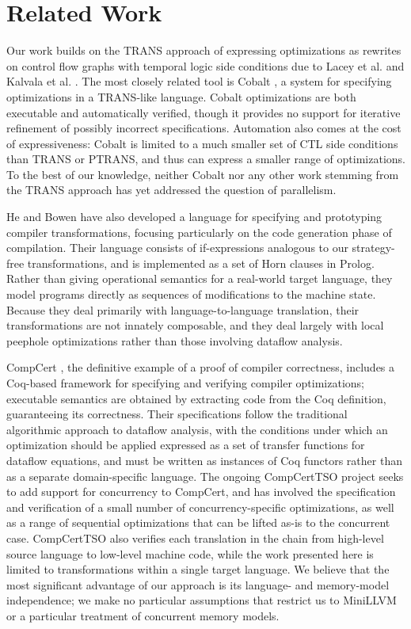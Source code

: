 \documentclass{eptcs}
\newcommand{\ptrans}[0]{PTRANS}
\begin{document}
\section{Related Work}
Our work builds on the TRANS approach of expressing optimizations as rewrites on control flow graphs with temporal logic side conditions due to Lacey et al. \cite{lacey} and Kalvala et al. \cite{kalvala}. The most closely related tool is Cobalt \cite{cobalt}, a system for specifying optimizations in a TRANS-like language. Cobalt optimizations are both executable and automatically verified, though it provides no support for iterative refinement of possibly incorrect specifications. Automation also comes at the cost of expressiveness: Cobalt is limited to a much smaller set of CTL side conditions than TRANS or {\ptrans}, and thus can express a smaller range of optimizations. To the best of our knowledge, neither Cobalt nor any other work stemming from the TRANS approach has yet addressed the question of parallelism.

He and Bowen \cite{logiccomp} have also developed a language for specifying and prototyping compiler transformations, focusing particularly on the code generation phase of compilation. Their language consists of if-expressions analogous to our strategy-free transformations, and is implemented as a set of Horn clauses in Prolog. Rather than giving operational semantics for a real-world target language, they model programs directly as sequences of modifications to the machine state. Because they deal primarily with language-to-language translation, their transformations are not innately composable, and they deal largely with local peephole optimizations rather than those involving dataflow analysis.

CompCert \cite{compcert}, the definitive example of a proof of compiler correctness, includes a Coq-based framework for specifying and verifying compiler optimizations; executable semantics are obtained by extracting code from the Coq definition, guaranteeing its correctness. Their specifications follow the traditional algorithmic approach to dataflow analysis, with the conditions under which an optimization should be applied expressed as a set of transfer functions for dataflow equations, and must be written as instances of Coq functors rather than as a separate domain-specific language. The ongoing CompCertTSO project \cite{conccompcert} seeks to add support for concurrency to CompCert, and has involved the specification and verification of a small number of concurrency-specific optimizations, as well as a range of sequential optimizations that can be lifted as-is to the concurrent case. CompCertTSO also verifies each translation in the chain from high-level source language to low-level machine code, while the work presented here is limited to transformations within a single target language. We believe that the most significant advantage of our approach is its language- and memory-model independence; we make no particular assumptions that restrict us to MiniLLVM or a particular treatment of concurrent memory models.
\end{document}

